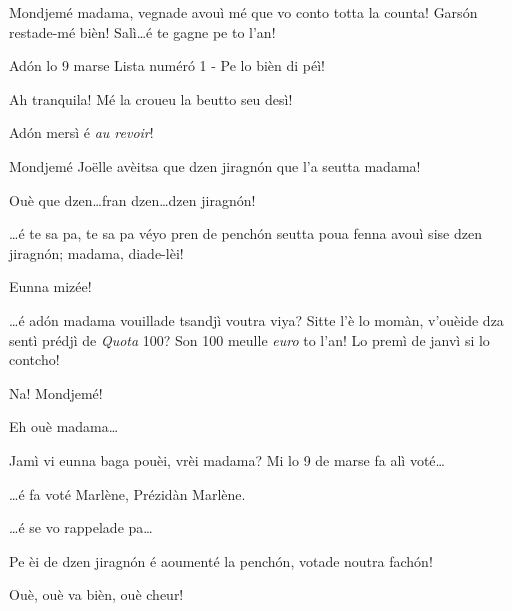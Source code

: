 \begin{drama}
\Dallasspeaks Mondjemé madama, vegnade avouì mé que vo conto totta la counta!  Gars\'on restade-mé bièn! Salì\ldots é te gagne pe to l'an!



\Joellespeaks Ad\'on lo 9 marse Lista num\'er\'o 1 - Pe lo bièn di péì!

\Jeanspeaks Ah tranquila!  Mé la croueu la beutto seu desì! 

\Joellespeaks Ad\'on mersì é \textit{au revoir}!




\Dallasspeaks {} Mondjemé Jo\"{e}lle avèitsa que dzen jiragn\'on que l'a seutta madama!

\Joellespeaks {} Ouè que dzen\ldots fran dzen\ldots dzen jiragn\'on!

\Dallasspeaks \ldots é te sa pa, te sa pa véyo pren de pench\'on seutta poua fenna avouì sise dzen jiragn\'on; madama, diade-lèi!

\Saventaspeaks Eunna mizée!

\Dallasspeaks \ldots é ad\'on madama vouillade tsandjì voutra viya? Sitte l'è lo momàn, v'ouèide dza sentì prédjì de \textit{Quota} 100? Son 100 meulle \textit{euro} to l'an! Lo premì de janvì si lo contcho!

\Saventaspeaks Na! Mondjemé!

\Joellespeaks Eh ouè madama\ldots

\Dallasspeaks Jamì vi eunna baga pouèi, vrèi madama? Mi lo 9 de marse fa alì voté\ldots

\Joellespeaks \ldots é fa voté Marlène, Prézidàn Marlène.

\Dallasspeaks \ldots é se vo rappelade pa\ldots

\Joelledallasspeaks {} Pe èi de dzen jiragn\'on é aoumenté la pench\'on, votade noutra fach\'on!


\Saventaspeaks Ouè, ouè va bièn, ouè cheur!


\end{drama}
